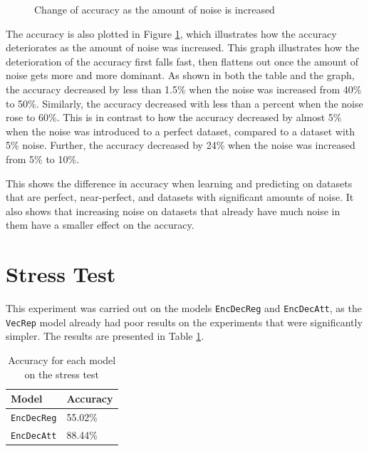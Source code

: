 \begin{figure}[ht]
    \centering
    \captionsetup{justification=centering}
    \caption{Change of accuracy as the amount of noise is increased}
    \label{fig:noise_accuracy}
\end{figure}

The accuracy is also plotted in Figure \ref{fig:noise_accuracy}, which illustrates how the accuracy deteriorates as the amount of noise was increased. This graph illustrates how the deterioration of the accuracy first falls fast, then flattens out once the amount of noise gets more and more dominant. As shown in both the table and the graph, the accuracy decreased by less than 1.5\% when the noise was increased from 40\% to 50\%. Similarly, the accuracy decreased with less than a percent when the noise rose to 60\%. This is in contrast to how the accuracy decreased by almost 5\% when the noise was introduced to a perfect dataset, compared to a dataset with 5\% noise. Further, the accuracy decreased by 24\% when the noise was increased from 5\% to 10\%.

This shows the difference in accuracy when learning and predicting on datasets that are perfect, near-perfect, and datasets with significant amounts of noise. It also shows that increasing noise on datasets that already have much noise in them have a smaller effect on the accuracy.


\section{Stress Test}
\label{sec:stress_test}
This experiment was carried out on the models {\tt EncDecReg} and {\tt EncDecAtt}, as the {\tt VecRep} model already had poor results on the experiments that were significantly simpler. The results are presented in Table \ref{table:accuracy_stress_test}.

\begin{table}[ht]
    \centering
    \begin{tabular}{|l|l|}
        \hline 
        \textbf{Model}                  & \textbf{Accuracy}         \\ \hline
        {\tt EncDecReg}                 & 55.02\%                   \\ \hline
        {\tt EncDecAtt}                 & 88.44\%                   \\ \hline
    \end{tabular}
    \caption{Accuracy for each model on the stress test}
    \label{table:accuracy_stress_test}
\end{table}

